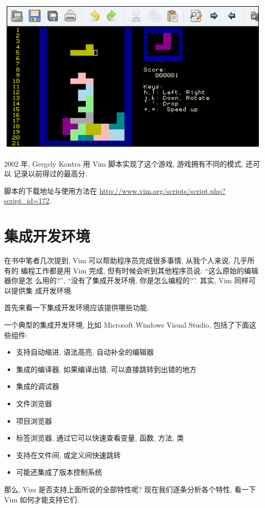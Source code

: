 \begin{center}
    \includegraphics[scale=0.7]{./images/page206.png}
\end{center}

2002 年, Gergely Kontra 用 Vim 脚本实现了这个游戏, 游戏拥有不同的模式, 还可以
记录以前得过的最高分.

脚本的下载地址与使用方法在
\url{http://www.vim.org/scripts/script.php?script_id=172}.

\section{集成开发环境}
\label{sec:programmers_ide}

在书中笔者几次提到, Vim 可以帮助程序员完成很多事情, 从我个人来说, 几乎所有的
编程工作都是用 Vim 完成, 但有时候会听到其他程序员说: ``这么原始的编辑器你是怎
么用的?'', ``没有了集成开发环境, 你是怎么编程的?''. 其实, Vim 同样可以提供集
成开发环境.

首先来看一下集成开发环境应该提供哪些功能.

一个典型的集成开发环境, 比如 Microsoft Windows Visual Studio\textregistered,
包括了下面这些组件:
\begin{itemize}
    \item 支持自动缩进, 语法高亮, 自动补全的编辑器
    \item 集成的编译器, 如果编译出错, 可以直接跳转到出错的地方
    \item 集成的调试器
    \item 文件浏览器
    \item 项目浏览器
    \item 标签浏览器, 通过它可以快速查看变量, 函数, 方法, 类
    \item 支持在文件间, 或定义间快速跳转
    \item 可能还集成了版本控制系统
\end{itemize}
那么, Vim 是否支持上面所说的全部特性呢? 现在我们逐条分析各个特性, 看一下 Vim
如何才能支持它们.

